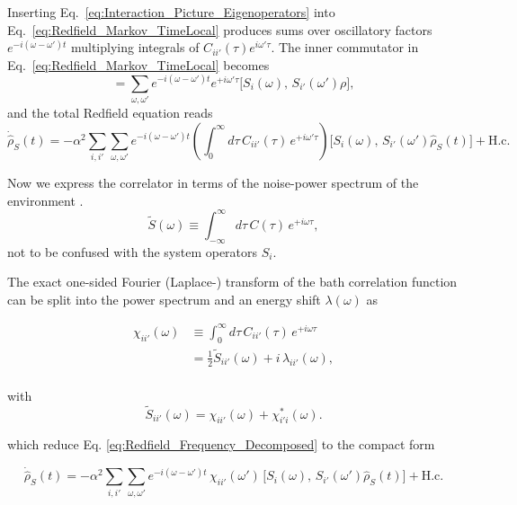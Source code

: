 \noindent
Inserting Eq.~\eqref{eq:Interaction_Picture_Eigenoperators} into Eq.~\eqref{eq:Redfield_Markov_TimeLocal} produces sums over oscillatory factors $e^{-i(\omega - \omega') t}$ multiplying integrals of $C_{ii'}(\tau) e^{i \omega' \tau}$. The inner commutator in Eq.~\eqref{eq:Redfield_Markov_TimeLocal} becomes
\begin{equation}
[\hat{S}_i(t),\, \hat{S}_{i'}(t-\tau)\rho]
= \sum_{\omega,\omega'} e^{-i(\omega - \omega')t} e^{+i \omega' \tau}
\big[ S_i(\omega),\, S_{i'}(\omega') \rho \big],
\tag{3}
\end{equation}
and the total Redfield equation reads
\begin{equation}
	\dot{\hat{\rho}}_S(t) = -\alpha^2 \sum_{i,i'} \sum_{\omega,\omega'} e^{-i(\omega - \omega')t}
	\left( \int_0^{\infty} d\tau\, C_{ii'}(\tau)\, e^{+i \omega' \tau} \right)
	\big[ S_i(\omega),\, S_{i'}(\omega') \hat{\rho}_S(t) \big]
	+ \text{H.c.}
	\label{eq:Redfield_Frequency_Decomposed}
\end{equation}

\noindent
Now we express the correlator in terms of the noise-power spectrum of the environment \cite{lambertetal2024qutip5quantum}.
\begin{equation}
	\tilde{S}(\omega) \equiv \int_{-\infty}^{\infty} d\tau\, C(\tau)\, e^{+i \omega \tau},
	\label{eq:Noise_Power_Spectrum}
\end{equation}
not to be confused with the system operators $S_i$.


\noindent
The exact one-sided Fourier (Laplace-) transform of the bath correlation function can be split into the power spectrum and an energy shift $ \lambda(\omega)$ as

\begin{align}
	\chi_{ii'}(\omega) &\equiv \int_0^{\infty} d\tau\, C_{ii'}(\tau)\, e^{+i \omega \tau} \\
					   &= \tfrac{1}{2}\tilde{S}_{ii'}(\omega)+i\,\lambda_{ii'}(\omega), \\
\end{align}

\noindent
with 
\begin{equation}
	\tilde{S}_{ii'}(\omega)=\chi_{ii'}(\omega)+\chi_{i'i}^*(\omega).
	\label{eq:Redfield_Rates_Definition}
\end{equation}

\noindent
which reduce Eq. \eqref{eq:Redfield_Frequency_Decomposed} to the compact form

\begin{equation}
	\boxed{
	\dot{\hat{\rho}}_S(t)
	= -\alpha^2 \sum_{i,i'} \sum_{\omega,\omega'} e^{-i(\omega - \omega')t}
	\, \chi_{ii'}(\omega') \,
	\big[ S_i(\omega),\, S_{i'}(\omega') \hat{\rho}_S(t) \big]
	+ \text{H.c.}
	}
\end{equation}

